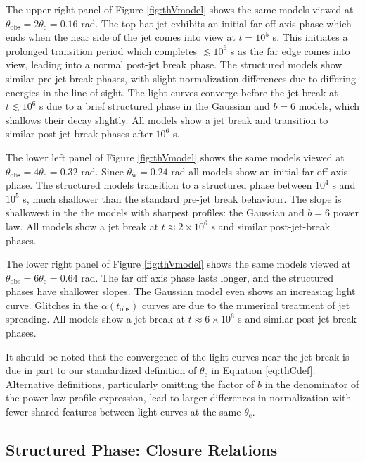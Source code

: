 \documentclass[twocolumn]{aastex62}
\newcommand{\tobs}{\ensuremath{t_{\mathrm{obs}}}}
\newcommand{\thobs}{\ensuremath{\theta_{\mathrm{obs}}}}
\newcommand{\thW}{\ensuremath{\theta_{\mathrm{w}}}}
\newcommand{\thC}{\ensuremath{\theta_{\mathrm{c}}}}
\begin{document}
The upper right panel of Figure \ref{fig:thVmodel} shows the same models viewed at $\thobs=2\thC=0.16$ rad.  The top-hat jet exhibits an initial far off-axis phase which ends when the near side of the jet comes into view at $t=10^5$ s.  This initiates a prolonged transition period which completes  $\lesssim 10^6$ s as the far edge comes into view, leading into a normal post-jet break phase.  The structured models show similar pre-jet break phases, with slight normalization differences due to differing energies in the line of sight.  The light curves converge before the jet break at $t \lesssim 10^6$ s due to a brief structured phase in the Gaussian and $b=6$ models, which shallows their decay slightly.   All models show a jet break and transition to similar post-jet break phases after $10^6$ s.

The lower left panel of Figure \ref{fig:thVmodel} shows the same models viewed at $\thobs=4\thC=0.32$ rad.  Since $\thW=0.24$ rad all models show an initial far-off axis phase.  The structured models transition to a structured phase between $10^4$ s and $10^5$ s, much shallower than the standard pre-jet break behaviour.  The slope is shallowest in the the models with sharpest profiles: the Gaussian and $b=6$ power law.  All models show a jet break at $t\approx 2\times 10^6$ s and similar post-jet-break phases.

The lower right panel of Figure \ref{fig:thVmodel} shows the same models viewed at $\thobs=6\thC=0.64$ rad.  The far off axis phase lasts longer, and the structured phases have shallower slopes.  The Gaussian model even shows an increasing light curve.  Glitches in the $\alpha(\tobs)$ curves are due to the numerical treatment of jet spreading.  All models show a jet break at $t\approx 6\times 10^6$ s and similar post-jet-break phases.

It should be noted that the convergence of the light curves near the jet break is due in part to our standardized definition of $\thC$ in Equation \eqref{eq:thCdef}.  Alternative definitions, particularly omitting the factor of $b$ in the denominator of the power law profile expression, lead to larger differences in normalization with fewer shared features between light curves at the same $\thC$.  

\subsection{Structured Phase: Closure Relations}\label{subsec:structure}
\end{document}
